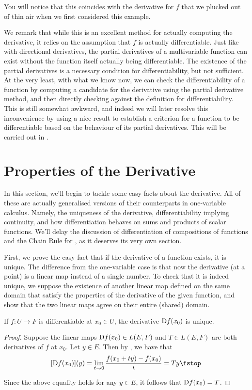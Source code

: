 You will notice that this coincides with the derivative for \( f \) that we plucked out of thin air when we first considered this example.

\vspace{3mm}

We remark that while this is an excellent method for actually computing the derivative, it relies on the assumption that \( f \) is actually differentiable. Just like with directional derivatives, the partial derivatives of a multivariable function can exist without the function itself actually being differentiable. The existence of the partial derivatives is a necessary condition for differentiability, but not sufficient. At the very least, with what we know now, we can check the differentiability of a function by computing a candidate for the derivative using the partial derivative method, and then directly checking against the definition for differentiability. This is still somewhat awkward, and indeed we will later resolve this inconvenience by using a nice result to establish a criterion for a function to be differentiable based on the behaviour of its partial derivatives. This will be carried out in .

\section{Properties of the Derivative}
In this section, we'll begin to tackle some easy facts about the derivative. All of these are actually generalised versions of their counterparts in one-variable calculus. Namely, the uniqueness of the derivative, differentiability implying continuity, and how differentiation behaves on sums and products of scalar functions. We'll delay the discussion of differentiation of compositions of functions and the Chain Rule for , as it deserves its very own section.

\vspace{3mm}

First, we prove the easy fact that if the derivative of a function exists, it is unique. The difference from the one-variable case is that now the derivative (at a point) is a linear map instead of a single number. To check that it is indeed unique, we suppose the existence of another linear map defined on the same domain that satisfy the properties of the derivative of the given function, and show that the two linear maps agree on their entire (shared) domain.
\begin{proposition}
  If \( f:U\to F \) is differentiable at \( x_0\in U \), the derivative \( \text{D} f(x_0) \) is unique.
\end{proposition}
\begin{proof}
  Suppose the linear maps \( \text{D} f(x_0)\in L(E,F) \) and \( T\in L(E,F) \) are both derivatives of \( f \) at \( x_0 \). Let \( y\in E \). Then by , we have that
  \[ [\D f(x_0)](y)=\lim_{t\to 0}\frac{f(x_0+ty)-f(x_0)}{t}=Ty\fstop \]

  Since the above equality holds for any \( y\in E \), it follows that \( \text{D} f(x_0)=T \).
\end{proof}

